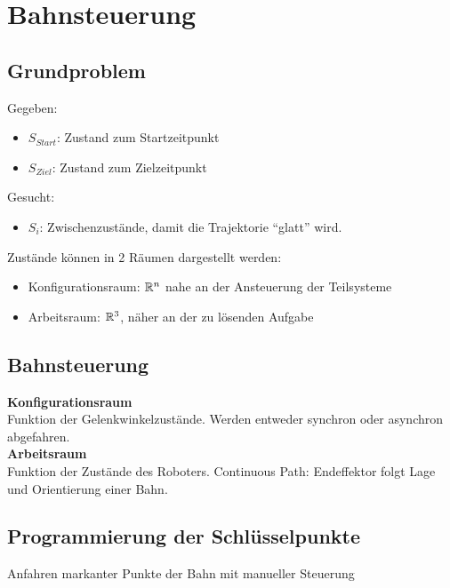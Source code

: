 

\section{Bahnsteuerung}%
\label{bs:sec:bahnsteuerung}

\subsection{Grundproblem}%
\label{bs:sub:grundproblem}
Gegeben:
\begin{itemize}
\item \(S_{\mathit{Start}}\): Zustand zum Startzeitpunkt
\item \(S_{\mathit{Ziel}}\): Zustand zum Zielzeitpunkt
\end{itemize}
Gesucht:
\begin{itemize}
\item \(S_i\): Zwischenzustände, damit die Trajektorie \enquote{glatt} wird.
\end{itemize}

Zustände können in 2 Räumen dargestellt werden:
\begin{itemize}
\item Konfigurationsraum: \(\mathbb{R}^n\) nahe an der Ansteuerung der Teilsysteme
\item Arbeitsraum: \(\mathbb{R}^3\), \SE{} näher an der zu lösenden Aufgabe
\end{itemize}


\subsection{Bahnsteuerung}%
\label{bs:sub:bahnsteuerung}
\textbf{Konfigurationsraum}\\
Funktion der Gelenkwinkelzustände. Werden entweder synchron oder asynchron abgefahren.\\

\textbf{Arbeitsraum}\\
Funktion der Zustände des Roboters. Continuous Path: Endeffektor folgt Lage und Orientierung einer Bahn.\\


\subsection{Programmierung der Schlüsselpunkte}
\label{bs:sub:programmierung-schluesselpunkte}
Anfahren markanter Punkte der Bahn mit manueller Steuerung

